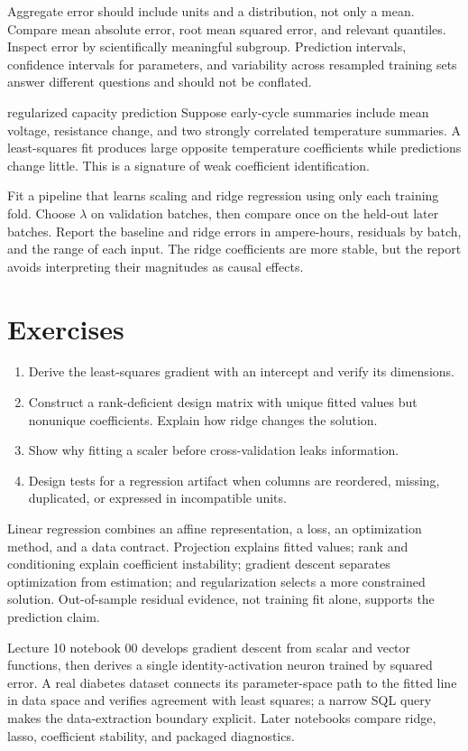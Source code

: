 Aggregate error should include units and a distribution, not only a mean.
Compare mean absolute error, root mean squared error, and relevant quantiles.
Inspect error by scientifically meaningful subgroup. Prediction intervals,
confidence intervals for parameters, and variability across resampled training
sets answer different questions and should not be conflated.

\begin{workedexample}{regularized capacity prediction}
Suppose early-cycle summaries include mean voltage, resistance change, and two
strongly correlated temperature summaries. A least-squares fit produces large
opposite temperature coefficients while predictions change little. This is a
signature of weak coefficient identification.

Fit a pipeline that learns scaling and ridge regression using only each
training fold. Choose $\lambda$ on validation batches, then compare once on the
held-out later batches. Report the baseline and ridge errors in ampere-hours,
residuals by batch, and the range of each input. The ridge coefficients are more
stable, but the report avoids interpreting their magnitudes as causal effects.
\end{workedexample}

\section{Exercises}
\begin{enumerate}
  \item Derive the least-squares gradient with an intercept and verify its
  dimensions.
  \item Construct a rank-deficient design matrix with unique fitted values but
  nonunique coefficients. Explain how ridge changes the solution.
  \item Show why fitting a scaler before cross-validation leaks information.
  \item Design tests for a regression artifact when columns are reordered,
  missing, duplicated, or expressed in incompatible units.
\end{enumerate}

\begin{chapterreview}
Linear regression combines an affine representation, a loss, an optimization
method, and a data contract. Projection explains fitted values; rank and
conditioning explain coefficient instability; gradient descent separates
optimization from estimation; and regularization selects a more constrained
solution. Out-of-sample residual evidence, not training fit alone, supports the
prediction claim.
\end{chapterreview}

\begin{notebooklink}
Lecture 10 notebook 00 develops gradient descent from scalar and vector
functions, then derives a single identity-activation neuron trained by squared
error. A real diabetes dataset connects its parameter-space path to the fitted
line in data space and verifies agreement with least squares; a narrow SQL query
makes the data-extraction boundary explicit. Later notebooks compare ridge,
lasso, coefficient stability, and packaged diagnostics.
\end{notebooklink}
